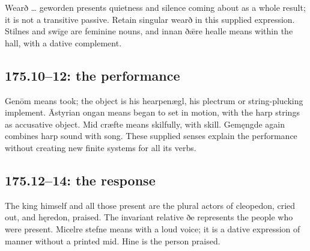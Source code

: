 Wearð … geworden presents quietness and silence coming about as a whole result; it is not a transitive passive. Retain singular wearð in this supplied expression. Stilnes and swīge are feminine nouns, and innan ðǣre healle means within the hall, with a dative complement.

\subsection*{175.10–12: the performance}

Genōm means took; the object is his hearpenægl, his plectrum or string-plucking implement. Āstyrian ongan means began to set in motion, with the harp strings as accusative object. Mid cræfte means skilfully, with skill. Gemęngde again combines harp sound with song. These supplied senses explain the performance without creating new finite systems for all its verbs.

\subsection*{175.12–14: the response}

The king himself and all those present are the plural actors of cleopedon, cried out, and hęredon, praised. The invariant relative ðe represents the people who were present. Micelre stefne means with a loud voice; it is a dative expression of manner without a printed mid. Hine is the person praised.

